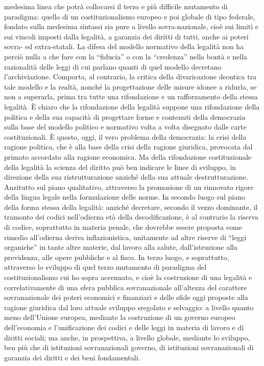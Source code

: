 medesima linea che potrà collocarsi il terzo e più difficile mutamento di paradigma: quello di un costituzionalismo europeo e poi globale di tipo federale, fondato sulla medesima sintassi sia pure a livello sovra-nazionale, cioè sui limiti e sui vincoli imposti dalla legalità, a garanzia dei diritti di tutti, anche ai poteri sovra- ed extra-statali.
La difesa del modello normativo della legalità non ha perciò nulla a che fare con la “fiducia” o con la “credenza” nella bontà e nella razionalità delle leggi di cui parlano quanti di quel modello decretano l’archiviazione. Comporta, al contrario, la critica della divaricazione deontica tra tale modello e la realtà, nonché la progettazione delle misure idonee a ridurla, se non a superarla, prima tra tutte una rifondazione e un rafforzamento della stessa legalità. È chiaro che la rifondazione della legalità suppone una rifondazione della politica e della sua capacità di progettare forme e contenuti della democrazia sulla base del modello politico e normativo volta a volta disegnato dalle carte costituzionali. È questo, oggi, il vero problema della democrazia: la crisi della ragione politica, che è alla base della crisi della ragione giuridica, provocata dal primato accordato alla ragione economica. Ma della rifondazione costituzionale della legalità la scienza del diritto può ben indicare le linee di sviluppo, in direzione della sua ristrutturazione anziché della sua attuale destrutturazione. Anzitutto sul piano qualitativo, attraverso la promozione di un rinnovato rigore della lingua legale nella formulazione delle norme. In secondo luogo sul piano della forma stessa della legalità: anziché decretare, secondo il vezzo dominante, il tramonto dei codici nell’odierna età della decodificazione, è al contrario la riserva di codice, soprattutto in materia penale, che dovrebbe essere proposta come rimedio all’odierna deriva inflazionistica, unitamente ad altre riserve di “leggi organiche” in tante altre materie, dal lavoro alla salute, dall’istruzione alla previdenza, alle opere pubbliche e al fisco. In terzo luogo, e soprattutto, attraverso lo sviluppo di quel terzo mutamento di paradigma del costituzionalismo cui ho sopra accennato, e cioè la costruzione di una legalità e correlativamente di una sfera pubblica sovranazionale all’altezza del carattere sovranazionale dei poteri economici e finanziari e delle sfide oggi proposte alla ragione giuridica dal loro attuale sviluppo sregolato e selvaggio: a livello quanto meno dell’Unione europea, mediante la costruzione di un governo europeo dell’economia e l’unificazione dei codici e delle leggi in materia di lavoro e di diritti sociali; ma anche, in prospettiva, a livello globale, mediante lo sviluppo, ben più che di istituzioni sovranazionali governo, di istituzioni sovranazionali di garanzia dei diritti e dei beni fondamentali.
